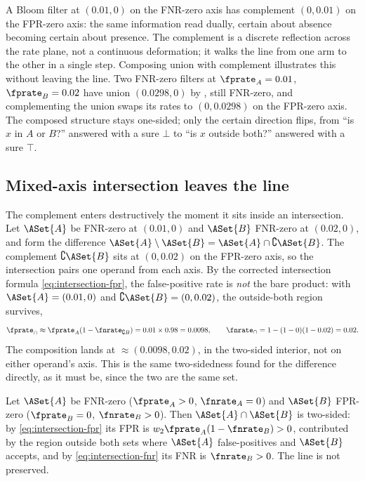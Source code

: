 A Bloom filter at $(0.01, 0)$ on the FNR-zero axis has complement $(0, 0.01)$
on the FPR-zero axis: the same information read dually, certain about absence
becoming certain about presence. The complement is a discrete reflection
across the rate plane, not a continuous deformation; it walks the line from
one arm to the other in a single step. Composing union with complement
illustrates this without leaving the line. Two FNR-zero filters at $\fprate_A
= 0.01$, $\fprate_B = 0.02$ have union $(0.0298, 0)$ by
, still FNR-zero, and complementing the union swaps
its rates to $(0, 0.0298)$ on the FPR-zero axis. The composed structure stays
one-sided; only the certain direction flips, from ``is $x$ in $A$ or $B$?''
answered with a sure $\bot$ to ``is $x$ outside both?'' answered with a sure
$\top$.

\subsection*{Mixed-axis intersection leaves the line}

The complement enters destructively the moment it sits inside an
intersection. Let $\ASet{A}$ be FNR-zero at $(0.01, 0)$ and $\ASet{B}$
FNR-zero at $(0.02, 0)$, and form the difference $\ASet{A} \setminus \ASet{B}
= \ASet{A} \cap \complement \ASet{B}$. The complement $\complement \ASet{B}$
sits at $(0, 0.02)$ on the FPR-zero axis, so the intersection pairs one
operand from each axis. By the corrected intersection formula
\eqref{eq:intersection-fpr}, the false-positive rate is \emph{not} the bare
product: with $\ASet{A} = (0.01, 0)$ and $\complement \ASet{B} = (0, 0.02)$,
the outside-both region survives,
\[
  \fprate_\cap \approx \fprate_A (1 - \fnrate_{\complement B})
              = 0.01 \times 0.98 = 0.0098,
  \qquad
  \fnrate_\cap = 1 - (1 - 0)(1 - 0.02) = 0.02.
\]
The composition lands at $\approx (0.0098, 0.02)$, in the two-sided interior,
not on either operand's axis. This is the same two-sidedness
 found for the difference directly, as it must be,
since the two are the same set.

\begin{proposition}
\label{prop:mixed-intersection-escape}
Let $\ASet{A}$ be FNR-zero ($\fprate_A > 0$, $\fnrate_A = 0$) and $\ASet{B}$
FPR-zero ($\fprate_B = 0$, $\fnrate_B > 0$). Then $\ASet{A} \cap \ASet{B}$ is
two-sided: by \eqref{eq:intersection-fpr} its FPR is $w_2 \fprate_A(1 -
\fnrate_B) > 0$, contributed by the region outside both sets where $\ASet{A}$
false-positives and $\ASet{B}$ accepts, and by \eqref{eq:intersection-fnr}
its FNR is $\fnrate_B > 0$. The line is not preserved.
\end{proposition}


